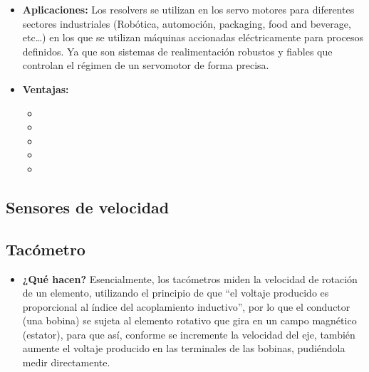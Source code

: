 \begin{itemize}
	\item \textbf{Aplicaciones:} Los resolvers se utilizan en los servo motores para diferentes sectores industriales (Robótica, automoción, packaging, food and beverage, etc…) en los que se utilizan máquinas accionadas eléctricamente para procesos definidos. Ya que son sistemas de realimentación robustos y fiables que controlan el régimen de un servomotor de forma precisa.
	\item \textbf{Ventajas:}
	\begin{itemize}
		\item {} 
		\item {} 
		\item {} 
		\item {}
		\item {}
	\end{itemize}
\end{itemize}




\subsection{Sensores de velocidad}
\subsection*{Tacómetro}
\begin{itemize}
	\item \textbf{¿Qué hacen?} Esencialmente, los tacómetros miden la velocidad de rotación de un elemento, utilizando el principio de que “el voltaje producido es proporcional al índice del acoplamiento inductivo”, por lo que el conductor (una bobina) se sujeta al elemento rotativo que gira en un campo magnético (estator), para que así, conforme se incremente la velocidad del eje, también aumente el voltaje producido en las terminales de las bobinas, pudiéndola medir directamente.
\end{itemize}

